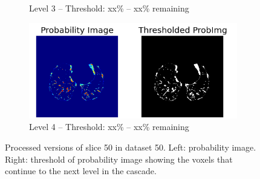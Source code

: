 \begin{figure}[p]
\begin{center}
\begin{subfigure}[b]{\linewidth}
		\caption{Level 3 -- Threshold: xx\% -- xx\% remaining}
	\end{subfigure}
	\begin{subfigure}[b]{\linewidth}
		\includegraphics[width=\linewidth]{img/cascades/D50L4S50.png}
		\caption{Level 4 -- Threshold: xx\% -- xx\% remaining}
	\end{subfigure}
  \caption{Processed versions of slice 50 in dataset 50. Left: probability
  image. Right: threshold of probability image showing the voxels that continue
  to the next level in the cascade.}
  \label{fig:d50s50}
\end{center}
\end{figure}

